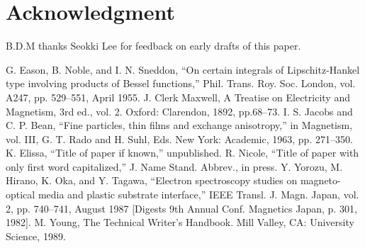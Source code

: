 \documentclass[conference]{IEEEtran}
\begin{document}
\section*{Acknowledgment}

B.D.M thanks Seokki Lee for feedback on early drafts of this paper.

\begin{thebibliography}{00}
     G. Eason, B. Noble, and I. N. Sneddon, ``On certain integrals of Lipschitz-Hankel type involving products of Bessel functions,'' Phil. Trans. Roy. Soc. London, vol. A247, pp. 529--551, April 1955.
     J. Clerk Maxwell, A Treatise on Electricity and Magnetism, 3rd ed., vol. 2. Oxford: Clarendon, 1892, pp.68--73.
     I. S. Jacobs and C. P. Bean, ``Fine particles, thin films and exchange anisotropy,'' in Magnetism, vol. III, G. T. Rado and H. Suhl, Eds. New York: Academic, 1963, pp. 271--350.
     K. Elissa, ``Title of paper if known,'' unpublished.
     R. Nicole, ``Title of paper with only first word capitalized,'' J. Name Stand. Abbrev., in press.
     Y. Yorozu, M. Hirano, K. Oka, and Y. Tagawa, ``Electron spectroscopy studies on magneto-optical media and plastic substrate interface,'' IEEE Transl. J. Magn. Japan, vol. 2, pp. 740--741, August 1987 [Digests 9th Annual Conf. Magnetics Japan, p. 301, 1982].
     M. Young, The Technical Writer's Handbook. Mill Valley, CA: University Science, 1989.
\end{thebibliography}
\end{document}
